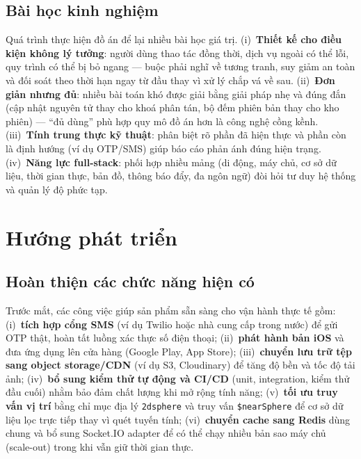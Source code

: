 \documentclass[../main.tex]{subfiles}%
\begin{document}
\subsection{Bài học kinh nghiệm}
\label{subsection:6.1.4}

Quá trình thực hiện đồ án để lại nhiều bài học giá trị. (i)~\textbf{Thiết kế cho điều kiện không lý tưởng}: người dùng thao tác đồng thời, dịch vụ ngoài có thể lỗi, quy trình có thể bị bỏ ngang --- buộc phải nghĩ về tương tranh, suy giảm an toàn và đối soát theo thời hạn ngay từ đầu thay vì xử lý chắp vá về sau. (ii)~\textbf{Đơn giản nhưng đủ}: nhiều bài toán khó được giải bằng giải pháp nhẹ và đúng đắn (cập nhật nguyên tử thay cho khoá phân tán, bộ đếm phiên bản thay cho kho phiên) --- ``đủ dùng'' phù hợp quy mô đồ án hơn là công nghệ cồng kềnh. (iii)~\textbf{Tính trung thực kỹ thuật}: phân biệt rõ phần đã hiện thực và phần còn là định hướng (ví dụ OTP/SMS) giúp báo cáo phản ánh đúng hiện trạng. (iv)~\textbf{Năng lực full-stack}: phối hợp nhiều mảng (di động, máy chủ, cơ sở dữ liệu, thời gian thực, bản đồ, thông báo đẩy, đa ngôn ngữ) đòi hỏi tư duy hệ thống và quản lý độ phức tạp.

\section{Hướng phát triển}
\label{section:6.2}

\subsection{Hoàn thiện các chức năng hiện có}
\label{subsection:6.2.1}

Trước mắt, các công việc giúp sản phẩm sẵn sàng cho vận hành thực tế gồm: (i)~\textbf{tích hợp cổng SMS} (ví dụ Twilio hoặc nhà cung cấp trong nước) để gửi OTP thật, hoàn tất luồng xác thực số điện thoại; (ii)~\textbf{phát hành bản iOS} và đưa ứng dụng lên cửa hàng (Google Play, App Store); (iii)~\textbf{chuyển lưu trữ tệp sang object storage/CDN} (ví dụ S3, Cloudinary) để tăng độ bền và tốc độ tải ảnh; (iv)~\textbf{bổ sung kiểm thử tự động và CI/CD} (unit, integration, kiểm thử đầu cuối) nhằm bảo đảm chất lượng khi mở rộng tính năng; (v)~\textbf{tối ưu truy vấn vị trí} bằng chỉ mục địa lý \texttt{2dsphere} và truy vấn \texttt{\$nearSphere} để cơ sở dữ liệu lọc trực tiếp thay vì quét tuyến tính; (vi)~\textbf{chuyển cache sang Redis} dùng chung và bổ sung Socket.IO adapter để có thể chạy nhiều bản sao máy chủ (scale-out) trong khi vẫn giữ thời gian thực.
\end{document}
